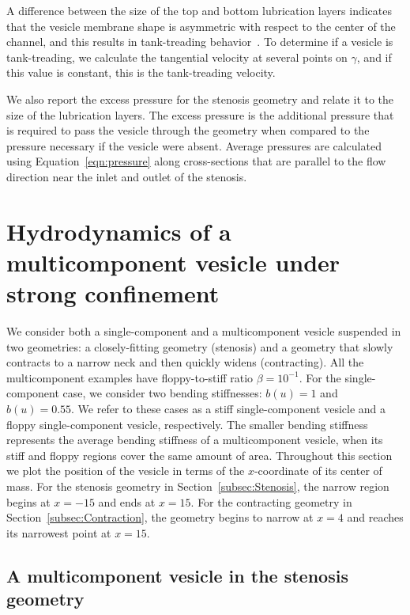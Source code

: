 \documentclass[twoside,twocolumn,9pt]{article}
\begin{document}
A difference between the size of the top and bottom lubrication layers
indicates that the vesicle membrane shape is asymmetric with respect to
the center of the channel, and this results in tank-treading
behavior~\cite{aga-bir2020}. To determine if a vesicle is tank-treading,
we calculate the tangential velocity at several points on $\gamma$, and
if this value is constant, this is the tank-treading velocity.

We also report the excess pressure for the stenosis geometry and relate
it to the size of the lubrication layers. The excess pressure is the
additional pressure that is required to pass the vesicle through the
geometry when compared to the pressure necessary if the vesicle were
absent. Average pressures are calculated using
Equation~\eqref{eqn:pressure} along cross-sections that are parallel to
the flow direction near the inlet and outlet of the stenosis.

\section{\label{sec:results}Hydrodynamics of a multicomponent vesicle
under strong confinement}
We consider both a single-component and a multicomponent vesicle
suspended in two geometries: a closely-fitting geometry (stenosis) and a
geometry that slowly contracts to a narrow neck and then quickly widens
(contracting). 
All the multicomponent examples have floppy-to-stiff ratio $\beta = 10^{-1}$.
For the single-component case, we consider two bending stiffnesses:
$b(u) = 1$ and $b(u) = 0.55$. We refer to these cases as a stiff
single-component vesicle and a floppy single-component vesicle,
respectively. The smaller bending stiffness represents the average
bending stiffness of a multicomponent vesicle, when its stiff and floppy
regions cover the same amount of area. Throughout this section we plot
the position of the vesicle in terms of the $x$-coordinate of its center
of mass. For the stenosis geometry in Section~\ref{subsec:Stenosis}, the
narrow region begins at $x=-15$ and ends at $x=15$. For the contracting
geometry in Section~\ref{subsec:Contraction}, the geometry begins to
narrow at $x=4$ and reaches its narrowest point at $x=15$.


\subsection{\label{subsec:Stenosis}A multicomponent vesicle in the
stenosis geometry}
\end{document}
